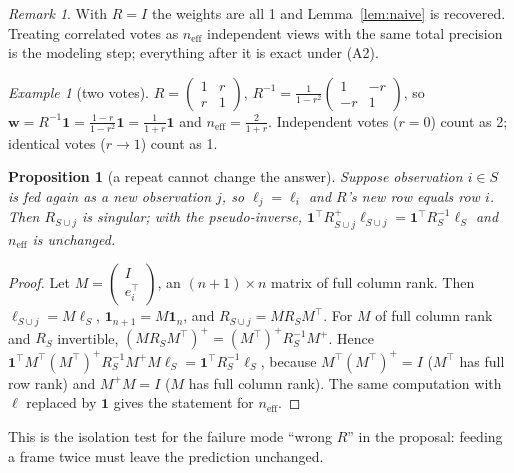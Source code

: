 \documentclass[11pt]{article}
\theoremstyle{plain}
\newtheorem{prop}{Proposition}
\theoremstyle{remark}
\newtheorem*{rem}{Remark}
\newtheorem*{ex}{Example}
\newcommand{\one}{\mathbf{1}}
\begin{document}
\begin{rem}
With $R=I$ the weights are all 1 and Lemma~\ref{lem:naive} is recovered. Treating correlated votes as $n_{\text{eff}}$ independent views with the same total precision is the modeling step; everything after it is exact under (A2).
\end{rem}

\begin{ex}[two votes]
$R=\begin{pmatrix}1&r\\ r&1\end{pmatrix}$, $R^{-1}=\frac{1}{1-r^2}\begin{pmatrix}1&-r\\-r&1\end{pmatrix}$, so $\bm w=R^{-1}\one=\frac{1-r}{1-r^2}\one=\frac{1}{1+r}\one$ and $n_{\text{eff}}=\frac{2}{1+r}$. Independent votes ($r=0$) count as 2; identical votes ($r\to1$) count as 1.
\end{ex}

\begin{prop}[a repeat cannot change the answer]\label{prop:repeat}
Suppose observation $i\in S$ is fed again as a new observation $j$, so $\ell_j=\ell_i$ and $R$'s new row equals row $i$. Then $R_{S\cup j}$ is singular; with the pseudo-inverse, $\one^\top R_{S\cup j}^{+}\bm\ell_{S\cup j}=\one^\top R_S^{-1}\bm\ell_S$ and $n_{\text{eff}}$ is unchanged.
\end{prop}
\begin{proof}
Let $M=\begin{pmatrix}I\\ e_i^\top\end{pmatrix}$, an $(n{+}1)\times n$ matrix of full column rank. Then $\bm\ell_{S\cup j}=M\bm\ell_S$, $\one_{n+1}=M\one_n$, and $R_{S\cup j}=MR_SM^\top$. For $M$ of full column rank and $R_S$ invertible, $(MR_SM^\top)^+=(M^\top)^+R_S^{-1}M^+$. Hence
$\one^\top M^\top(M^\top)^+R_S^{-1}M^+M\bm\ell_S=\one^\top R_S^{-1}\bm\ell_S$,
because $M^\top(M^\top)^+=I$ ($M^\top$ has full row rank) and $M^+M=I$ ($M$ has full column rank). The same computation with $\bm\ell$ replaced by $\one$ gives the statement for $n_{\text{eff}}$.
\end{proof}

This is the isolation test for the failure mode ``wrong $R$'' in the proposal: feeding a frame twice must leave the prediction unchanged.
\end{document}
